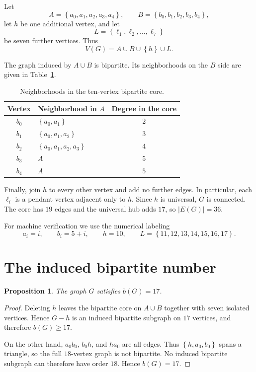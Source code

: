 \documentclass[11pt]{article}
\newtheorem{proposition}[theorem]{Proposition}
\newcommand{\set}[1]{\left\{#1\right\}}
\begin{document}
Let
\[
 A=\set{a_0,a_1,a_2,a_3,a_4},\qquad
 B=\set{b_0,b_1,b_2,b_3,b_4},
\]
let $h$ be one additional vertex, and let
\[
 L=\set{\ell_1,\ell_2,\ldots,\ell_7}
\]
be seven further vertices. Thus
\[
 V(G)=A\cup B\cup\set{h}\cup L.
\]

The graph induced by $A\cup B$ is bipartite. Its neighborhoods on the $B$ side
are given in Table~\ref{tab:neighborhoods}.

\begin{table}[ht]
\centering
\caption{Neighborhoods in the ten-vertex bipartite core.}
\label{tab:neighborhoods}
\begin{tabular}{@{}c l c@{}}
\toprule
Vertex & Neighborhood in $A$ & Degree in the core \\
\midrule
$b_0$ & $\set{a_0,a_1}$                         & $2$ \\
$b_1$ & $\set{a_0,a_1,a_2}$                     & $3$ \\
$b_2$ & $\set{a_0,a_1,a_2,a_3}$                 & $4$ \\
$b_3$ & $A$                                      & $5$ \\
$b_4$ & $A$                                      & $5$ \\
\bottomrule
\end{tabular}
\end{table}

Finally, join $h$ to every other vertex and add no further edges. In
particular, each $\ell_i$ is a pendant vertex adjacent only to $h$. Since $h$
is universal, $G$ is connected. The core has $19$ edges and the universal hub
adds $17$, so $|E(G)|=36$.

For machine verification we use the numerical labeling
\[
 a_i=i,\qquad b_i=5+i,\qquad h=10,\qquad
 L=\set{11,12,13,14,15,16,17}.
\]

\section{The induced bipartite number}

\begin{proposition}\label{prop:b}
The graph $G$ satisfies $b(G)=17$.
\end{proposition}

\begin{proof}
Deleting $h$ leaves the bipartite core on $A\cup B$ together with seven
isolated vertices. Hence $G-h$ is an induced bipartite subgraph on $17$
vertices, and therefore $b(G)\ge17$.

On the other hand, $a_0b_0$, $b_0h$, and $ha_0$ are all edges. Thus
$\set{h,a_0,b_0}$ spans a triangle, so the full $18$-vertex graph is not
bipartite. No induced bipartite subgraph can therefore have order $18$.
Hence $b(G)=17$.
\end{proof}
\end{document}
